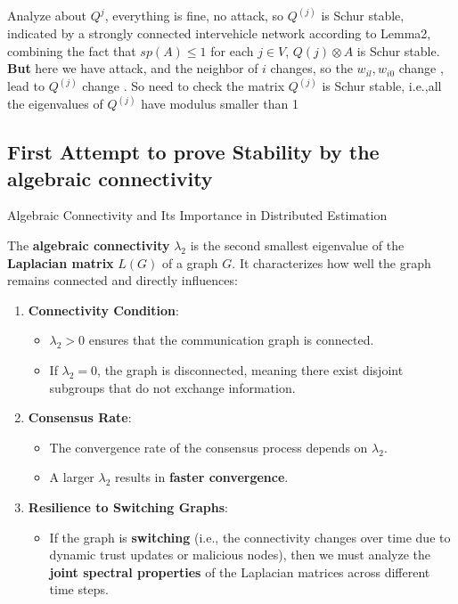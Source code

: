 \documentclass[letterpaper, 10pt, conference]{ieeeconf}  %
\begin{document}
Analyze about $Q^{j}$, everything is fine, no attack, so $ Q^{(j)}$ is Schur stable, indicated by a strongly connected intervehicle network according to Lemma2, combining the fact that $sp(A) \leq 1 $ for each $j \in V$, $Q(j) \otimes A$ is Schur stable. 
\\ 

\textbf{But} here we have attack, and the neighbor of $i$ changes, so the $ w_{il} , w_{i 0}$ change , lead to $Q^{(j)}$ change . So need to check the matrix $Q^{(j)}$ is Schur stable, i.e.,all the eigenvalues of $Q^{(j)}$ have modulus smaller than 1

 \subsection{First Attempt to prove Stability by the algebraic connectivity  }
Algebraic Connectivity and Its Importance in Distributed Estimation \cite{algebraic_connectivity}

The \textbf{algebraic connectivity} \( \lambda_2 \) is the second smallest eigenvalue of the \textbf{Laplacian matrix} \( L(G) \) of a graph \( G \). It characterizes how well the graph remains connected and directly influences:

\begin{enumerate}
    \item \textbf{Connectivity Condition}:
    \begin{itemize}
        \item \( \lambda_2 > 0 \) ensures that the communication graph is connected.
        \item If \( \lambda_2 = 0 \), the graph is disconnected, meaning there exist disjoint subgroups that do not exchange information.
    \end{itemize}
    
    \item \textbf{Consensus Rate}:
    \begin{itemize}
        \item The convergence rate of the consensus process depends on \( \lambda_2 \).
        \item A larger \( \lambda_2 \) results in \textbf{faster convergence}.
    \end{itemize}
    
    \item \textbf{Resilience to Switching Graphs}:
    \begin{itemize}
        \item If the graph is \textbf{switching} (i.e., the connectivity changes over time due to dynamic trust updates or malicious nodes), then we must analyze the \textbf{joint spectral properties} of the Laplacian matrices across different time steps.
    \end{itemize}
\end{enumerate}
\end{document}
